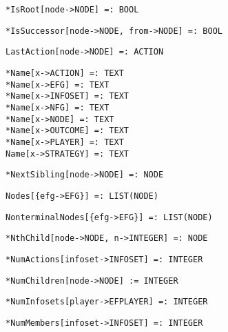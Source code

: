\protect \large \begin{verbatim}
*IsRoot[node->NODE] =: BOOL
\end{verbatim}\normalsize

\protect \large \begin{verbatim}
*IsSuccessor[node->NODE, from->NODE] =: BOOL
\end{verbatim}\normalsize

\protect \large \begin{verbatim} 
LastAction[node->NODE] =: ACTION
\end{verbatim}\normalsize

\protect \large \begin{verbatim}
*Name[x->ACTION] =: TEXT
*Name[x->EFG] =: TEXT
*Name[x->INFOSET] =: TEXT
*Name[x->NFG] =: TEXT
*Name[x->NODE] =: TEXT
*Name[x->OUTCOME] =: TEXT
*Name[x->PLAYER] =: TEXT
Name[x->STRATEGY] =: TEXT
\end{verbatim}\normalsize

\protect \large \begin{verbatim}
*NextSibling[node->NODE] =: NODE
\end{verbatim}\normalsize

\protect \large \begin{verbatim} 
Nodes[{efg->EFG}] =: LIST(NODE)
\end{verbatim}\normalsize

\protect \large \begin{verbatim} 
NonterminalNodes[{efg->EFG}] =: LIST(NODE)
\end{verbatim}\normalsize

\protect \large \begin{verbatim} 
*NthChild[node->NODE, n->INTEGER] =: NODE
\end{verbatim}\normalsize

\protect \large \begin{verbatim}
*NumActions[infoset->INFOSET] =: INTEGER
\end{verbatim}\normalsize

\protect \large \begin{verbatim}
*NumChildren[node->NODE] := INTEGER
\end{verbatim}\normalsize

\protect \large \begin{verbatim}
*NumInfosets[player->EFPLAYER] =: INTEGER
\end{verbatim}\normalsize

\protect \large \begin{verbatim}
*NumMembers[infoset->INFOSET] =: INTEGER
\end{verbatim}\normalsize

